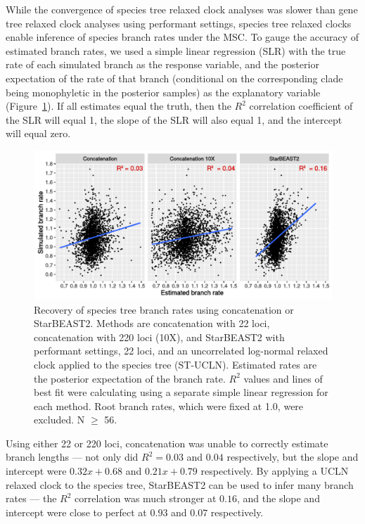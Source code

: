 \documentclass[12pt]{article}
\begin{document}
While the convergence of species tree relaxed clock analyses was slower than
gene tree relaxed clock analyses using performant settings, species tree relaxed
clocks enable inference of species branch rates under the MSC. To gauge the
accuracy of estimated branch rates, we used a simple linear regression (SLR)
with the true rate of each simulated branch as the response variable, and the
posterior expectation of the rate of that branch (conditional on the
corresponding clade being monophyletic in the posterior samples) as the
explanatory variable (Figure~\ref{fig:branchRatesLM}). If all estimates equal
the truth, then the $R^2$ correlation coefficient of the SLR will equal 1, the
slope of the SLR will also equal 1, and the intercept will equal zero.

\begin{figure}[htb!]
\centering
\includegraphics[width=16cm]{branch_rates.pdf}
\caption
{Recovery of species tree branch rates using concatenation or StarBEAST2.
Methods are concatenation with 22 loci, concatenation with 220 loci (10X), and
StarBEAST2 with performant settings, 22 loci, and an uncorrelated log-normal
relaxed clock applied to the species tree (ST-UCLN). Estimated rates are the
posterior expectation of the branch rate. $R^2$ values and lines of best fit were calculating using a separate
simple linear regression for each method. Root branch rates, which were fixed at
1.0, were excluded. N $\ge$ 56.}
\label{fig:branchRatesLM}
\end{figure}

Using either 22 or 220 loci, concatenation was unable to correctly estimate
branch lengths --- not only did $R^2 = 0.03$ and $0.04$ respectively, but the
slope and intercept were $0.32x + 0.68$ and $0.21x + 0.79$ respectively. By
applying a UCLN relaxed clock to the species tree, StarBEAST2 can be used to
infer many branch rates --- the $R^2$ correlation was much stronger at $0.16$,
and the slope and intercept were close to perfect at $0.93$ and $0.07$
respectively.
\end{document}
